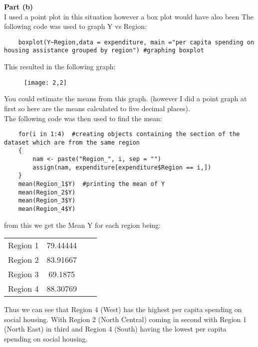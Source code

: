 \documentclass{article}
\begin{document}
\noindent\textbf{\large Part (b)\\}
I used a point plot in this situation however a box plot would have also been 
The following code was used to graph Y vs Region:
\begin{verbatim}
	boxplot(Y~Region,data = expenditure, main ="per capita spending on housing assistance grouped by region") #graphing boxplot
\end{verbatim}
This resulted in the following graph:\\

































\begin{figure}[h]
	\centering
	\texttt{[image: 2,2]}
\end{figure}
You could estimate the means from this graph. (however I did a point graph at first so here are the means calculated to five decimal places).\\
The following code was then used to find the mean:
\begin{verbatim}
	for(i in 1:4)  #creating objects containing the section of the dataset which are from the same region
	{ 
		nam <- paste("Region_", i, sep = "")
		assign(nam, expenditure[expenditure$Region == i,])
	}
	mean(Region_1$Y)  #printing the mean of Y
	mean(Region_2$Y)
	mean(Region_3$Y)
	mean(Region_4$Y)
\end{verbatim}
from this we get the Mean Y for each region being:
\begin{center}
	\begin{tabular}{ c c c c }
		Region 1 & 79.44444 \\ 
		Region 2 & 83.91667 \\
		Region 3 & 69.1875    \\
		Region 4 & 88.30769
	\end{tabular}
\end{center}

Thus we can see that Region 4 (West) has the highest per capita spending on social housing. With Region 2 (North Central) coming in second with Region 1 (North East) in third and Region 4 (South) having the lowest per capita spending on social housing. \pagebreak
\end{document}
